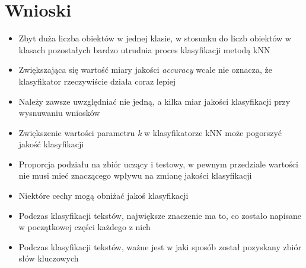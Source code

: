 \documentclass{classrep}
\begin{document}
    \section{Wnioski} {
        \begin{itemize}
            \item Zbyt duża liczba obiektów w jednej klasie, w stosunku do liczb obiektów w klasach
                pozostałych bardzo utrudnia proces klasyfikacji metodą kNN
            \item Zwiększająca się wartość miary jakości \emph{accuracy} wcale nie oznacza, że
                klasyfikator rzeczywiście działa coraz lepiej
            \item Należy zawsze uwzględniać nie jedną, a kilka miar jakości klasyfikacji przy
                wysnuwaniu wniosków
            \item Zwiększenie wartości parametru \emph{k} w klasyfikatorze kNN może pogorszyć jakość
                klasyfikacji
            \item Proporcja podziału na zbiór uczący i testowy, w pewnym przedziale wartości nie
                musi mieć znaczącego wpływu na zmianę jakości klasyfikacji
            \item Niektóre cechy mogą obniżać jakoś klasyfikacji
            \item Podczas klasyfikacji tekstów, największe znaczenie ma to, co zostało napisane w
                początkowej części każdego z nich
            \item Podczas klasyfikacji tekstów, ważne jest w jaki sposób został pozyskany zbiór
                słów kluczowych
        \end{itemize}
    }
\end{document}
